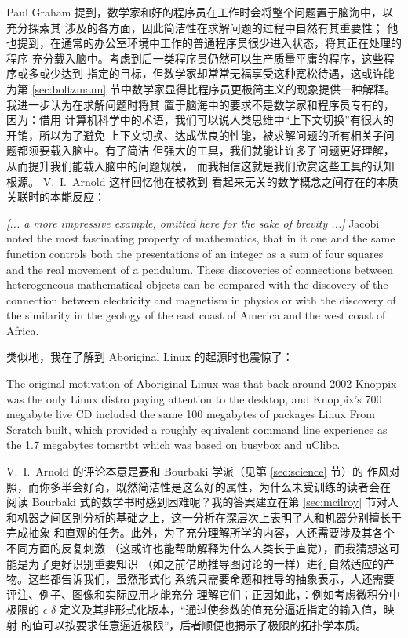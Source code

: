 Paul Graham 提到，数学家和好的程序员在工作时会将整个问题置于脑海中，以充分探索其
涉及的各方面，因此简洁性在求解问题的过程中自然有其重要性；
他也提到，在通常的办公室环境中工作的普通程序员很少进入状态，将其正在处理的程序
充分载入脑中。考虑到后一类程序员仍然可以生产质量平庸的程序，这些程序或多或少达到
指定的目标，但数学家却常常无福享受这种宽松待遇，这或许能为第 \ref{sec:boltzmann}
节中数学家显得比程序员更极简主义的现象提供一种解释。我进一步认为在求解问题时将其
置于脑海中的要求不是数学家和程序员专有的，因为：借用
计算机科学中的术语，我们可以说人类思维中“上下文切换”有很大的开销，所以为了避免
上下文切换、达成优良的性能，被求解问题的所有相关子问题都须要载入脑中。有了简洁
但强大的工具，我们就能让许多子问题更好理解，从而提升我们能载入脑中的问题规模，
而我相信这就是我们欣赏这些工具的认知根源。 V.\ I.\ Arnold 这样回忆他在被教到
看起来无关的数学概念之间存在的本质关联时的本能反应：
\begin{quoting}
	\emph{[... a more impressive example, omitted here for the sake of
	brevity ...]} Jacobi noted the most fascinating property of mathematics,
	that in it one and the same function controls both the presentations of
	an integer as a sum of four squares and the real movement of a pendulum.
	These discoveries of connections between heterogeneous mathematical objects
	can be compared with the discovery of the connection between electricity
	and magnetism in physics or with the discovery of the similarity in
	the geology of the east coast of America and the west coast of Africa.
\end{quoting}
类似地，我在了解到 Aboriginal Linux 的起源时也震惊了：
\begin{quoting}
	The original motivation of Aboriginal Linux was that back around
	2002 Knoppix was the only Linux distro paying attention to the
	desktop, and Knoppix's 700 megabyte live CD included the same
	100 megabytes of packages Linux From Scratch built, which
	provided a roughly equivalent command line experience as the
	1.7 megabytes tomsrtbt which was based on busybox and uClibc.
\end{quoting}

V.\ I.\ Arnold 的评论本意是要和 Bourbaki 学派（见第 \ref{sec:science} 节）的
作风对照，而你多半会好奇，既然简洁性是这么好的属性，为什么未受训练的读者会在
阅读 Bourbaki 式的数学书时感到困难呢？我的答案建立在第 \ref{sec:mcilroy} 节对人
和机器之间区别分析的基础之上，这一分析在深层次上表明了人和机器分别擅长于完成抽象
和直观的任务。此外，为了充分理解所学的内容，人还需要涉及其各个不同方面的反复刺激
（这或许也能帮助解释为什么人类长于直觉），而我猜想这可能是为了更好识别重要知识
（如之前借助推导图讨论的一样）进行自然适应的产物。这些都告诉我们，虽然形式化
系统只需要命题和推导的抽象表示，人还需要评注、例子、图像和实际应用才能充分
理解它们；正因如此，：例如考虑微积分中极限的 $\epsilon$-$\delta$
定义及其非形式化版本，“通过使参数的值充分逼近指定的输入值，映射
的值可以按要求任意逼近极限”，后者顺便也揭示了极限的拓扑学本质。

